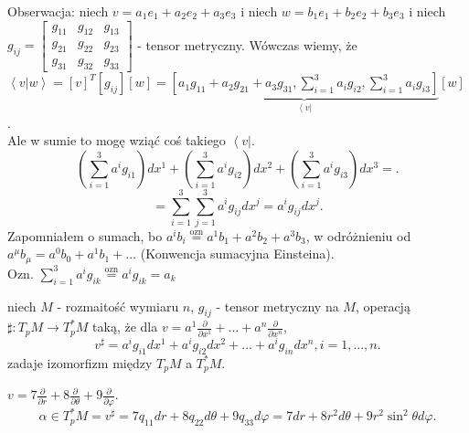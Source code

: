 \documentclass[../main.tex]{subfiles}
\begin{document}
Obserwacja: niech $v = a_1e_1 + a_2e_2 + a_3e_3$ i niech $w = b_1e_1 + b_2e_2 + b_3e_3$ i niech $g_{ij} = \begin{bmatrix} g_{11}&g_{12}&g_{13}\\ g_{21}& g_{22}&g_{23}\\ g_{31}&g_{32}&g_{33} \end{bmatrix} $ - tensor metryczny. Wówczas wiemy, że $\left<v|w \right> = \left[v\right]^T\left[ g_{ij} \right] \left[ w \right] = \underbrace{\left[ a_1g_{11}+a_2g_{21}+a_3g_{31},\sum_{i=1}^{3}a_ig_{i2},\sum_{i=1}^3a_ig_{i3} \right]}_{\left< v\right|}\left[ w \right]  $. \\
Ale w sumie to mogę wziąć coś takiego $\left< v \right|$.\\
\[
    \left( \sum_{i=1}^3 a^ig_{i1} \right) dx^1 + \left( \sum_{i=1}^3a^ig_{i2} \right) dx^2 + \left( \sum_{i=1}^3a^ig_{i3} \right)dx^3=
.\]
\[
= \sum_{i=1}^3\sum_{j=1}^3 a^ig_{ij}dx^j = a^ig_{ij}dx^j
.\]
Zapomniałem o sumach, bo $a^ib_i \overset{\text{ozn}}{=}  a^1b_1 + a^2b_2 + a^3b_3$, w odróżnieniu od $a^{\mu}b_\mu = a^0b_0+a^1b_1+\ldots$ (Konwencja sumacyjna Einsteina).\\
Ozn. $\sum_{i=1}^3 a^ig_{ik} \overset{\text{ozn}}{=} a^ig_{ik} = a_k$
\begin{definicja}
    niech $M$ - rozmaitość wymiaru $n$, $g_{ij}$ - tensor metryczny na $M$, operacją $\sharp: T_pM \to T_p^*M$ taką, że dla $v = a^1 \frac{\partial }{\partial x^1} + \ldots + a^n \frac{\partial }{\partial x^n} $,\\
    \[
    v^{\sharp}=a^ig_{i1}dx^1 + a^ig_{i2}dx^2 + \ldots + a^ig_{in}dx^n, i=1,\ldots,n
    .\]
    zadaje izomorfizm między $T_pM$ a $T_p^*M$.
\end{definicja}
\begin{przyklad}
    $v = 7 \frac{\partial }{\partial r} + 8 \frac{\partial }{\partial \theta} + 9 \frac{\partial }{\partial \varphi}$.
    \[
    \alpha\in T_p^*M  = v^{\sharp} = 7q_{11}dr+8q_{22}d\theta + 9q_{33}d\varphi = 7dr + 8r^2d\theta + 9r^2\sin^2\theta d\varphi
    .\]
\end{przyklad}
\end{document}
